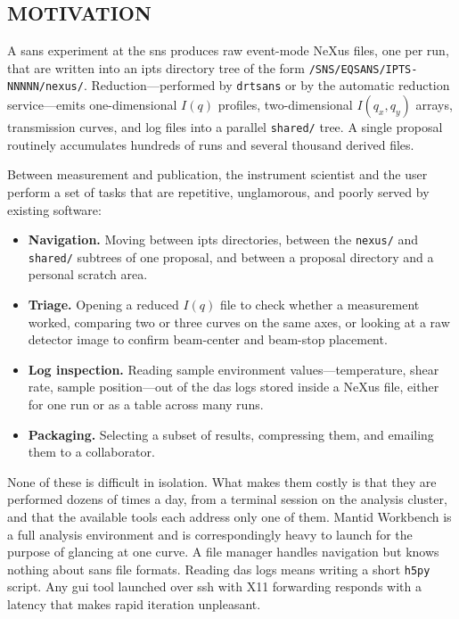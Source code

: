 \documentclass[tm]{ornltm}
\begin{document}
\subsection{MOTIVATION}

A \ac{sans} experiment at the \ac{sns} produces raw event-mode NeXus files, one
per run, that are written into an \ac{ipts} directory tree of the form
\texttt{/SNS/EQSANS/IPTS-NNNNN/nexus/}. Reduction---performed by
\texttt{drtsans} \autocite{drtsans} or by the automatic reduction service---emits
one-dimensional $I(q)$ profiles, two-dimensional $I(q_x,q_y)$ arrays,
transmission curves, and log files into a parallel \texttt{shared/} tree. A
single proposal routinely accumulates hundreds of runs and several thousand
derived files.

Between measurement and publication, the instrument scientist and the user
perform a set of tasks that are repetitive, unglamorous, and poorly served by
existing software:

\begin{itemize}
  \item \textbf{Navigation.} Moving between \ac{ipts} directories, between the
    \texttt{nexus/} and \texttt{shared/} subtrees of one proposal, and between a
    proposal directory and a personal scratch area.
  \item \textbf{Triage.} Opening a reduced $I(q)$ file to check whether a
    measurement worked, comparing two or three curves on the same axes, or
    looking at a raw detector image to confirm beam-center and beam-stop
    placement.
  \item \textbf{Log inspection.} Reading sample environment values---temperature,
    shear rate, sample position---out of the \ac{das} logs stored inside a NeXus
    file, either for one run or as a table across many runs.
  \item \textbf{Packaging.} Selecting a subset of results, compressing them, and
    emailing them to a collaborator.
\end{itemize}

None of these is difficult in isolation. What makes them costly is that they are
performed dozens of times a day, from a terminal session on the analysis cluster,
and that the available tools each address only one of them. Mantid Workbench
\autocite{mantid} is a full analysis environment and is correspondingly heavy to
launch for the purpose of glancing at one curve. A file manager handles
navigation but knows nothing about \ac{sans} file formats. Reading \ac{das} logs
means writing a short \texttt{h5py} \autocite{h5py} script. Any \ac{gui} tool
launched over \ac{ssh} with X11 forwarding responds with a latency that makes
rapid iteration unpleasant.
\end{document}
